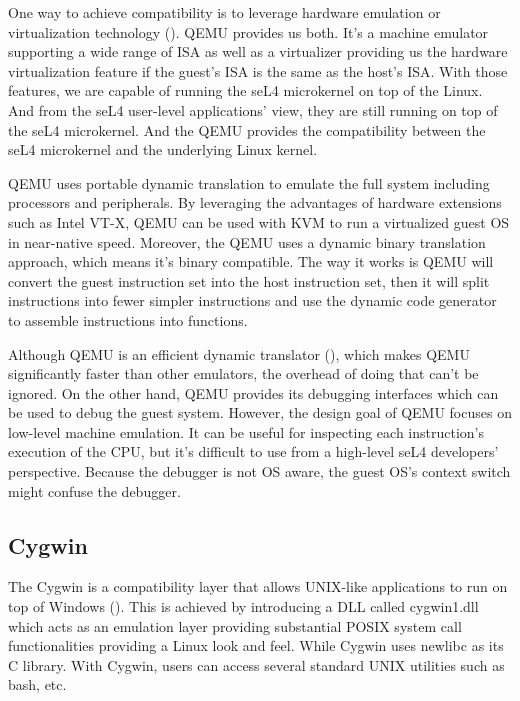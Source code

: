 
One way to achieve compatibility is to leverage hardware emulation or virtualization technology (\cite{enwikiqemu}). QEMU provides us both. It's a machine emulator supporting a wide range of ISA as well as a virtualizer providing us the hardware virtualization feature if the guest's ISA is the same as the host's ISA. With those features, we are capable of running the seL4 microkernel on top of the Linux. And from the seL4 user-level applications' view, they are still running on top of the seL4 microkernel. And the QEMU provides the compatibility between the seL4 microkernel and the underlying Linux kernel. 

QEMU uses portable dynamic translation to emulate the full system including processors and peripherals. By leveraging the advantages of hardware extensions such as Intel VT-X, QEMU can be used with KVM to run a virtualized guest OS in near-native speed. Moreover, the QEMU uses a dynamic binary translation approach, which means it's binary compatible. The way it works is QEMU will convert the guest instruction set into the host instruction set, then it will split instructions into fewer simpler instructions and use the dynamic code generator to assemble instructions into functions.

Although QEMU is an efficient dynamic translator (\cite{QEMU}), which makes QEMU significantly faster than other emulators, the overhead of doing that can't be ignored. On the other hand, QEMU provides its debugging interfaces which can be used to debug the guest system. However, the design goal of QEMU focuses on low-level machine emulation. It can be useful for inspecting each instruction's execution of the CPU, but it's difficult to use from a high-level seL4 developers' perspective. Because the debugger is not OS aware, the guest OS's context switch might confuse the debugger.

\subsection{Cygwin}


The Cygwin is a compatibility layer that allows UNIX-like applications to run on top of Windows (\cite{enwikicygwin}). This is achieved by introducing a DLL called cygwin1.dll which acts as an emulation layer providing substantial POSIX system call functionalities providing a Linux look and feel. While Cygwin uses newlibc as its C library. With Cygwin, users can access several standard UNIX utilities such as bash, etc.

